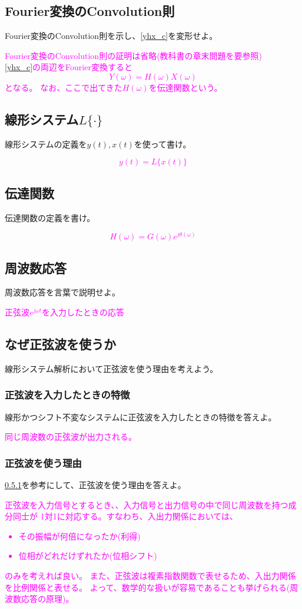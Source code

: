 \documentclass[twocolumn]{ltjsarticle}
\newcommand{\visible}{visible}
\newcommand{\ans}[1]{
\begin{tcolorbox}[\visible]
\textcolor{magenta}{#1}
\end{tcolorbox}
}
\begin{document}
\subsection{Fourier変換のConvolution則}\label{YHX}
Fourier変換のConvolution則を示し、\ref{yhx_c}を変形せよ。
\ans{Fourier変換のConvolution則の証明は省略(教科書の章末問題を要参照)\\
\ref{yhx_c}の両辺をFourier変換すると
$$Y(\omega)=H(\omega)X(\omega)$$
となる。
なお、ここで出てきた$H(\omega)$を伝達関数という。
}
\subsection{線形システム$L\{\cdot\}$}\label{yLx}
線形システムの定義を$y(t),x(t)$を使って書け。
\ans{
    $$y(t)=L\{x(t)\}$$
}
\subsection{伝達関数}\label{H}
伝達関数の定義を書け。
\ans{
    $$H(\omega)=G(\omega)e^{j\theta(\omega)}$$
}
\subsection{周波数応答}
周波数応答を言葉で説明せよ。
\ans{正弦波$e^{j\omega t}$を入力したときの応答}
\subsection{なぜ正弦波を使うか}
線形システム解析において正弦波を使う理由を考えよう。
\subsubsection{正弦波を入力したときの特徴}\label{sin}
線形かつシフト不変なシステムに正弦波を入力したときの特徴を答えよ。
\ans{
    同じ周波数の正弦波が出力される。
}
\subsubsection{正弦波を使う理由}
\ref{sin}を参考にして、正弦波を使う理由を答えよ。
\ans{
    正弦波を入力信号とするとき、、入力信号と出力信号の中で同じ周波数を持つ成分同士が
    1対1に対応する。すなわち、入出力関係においては、
    \begin{itemize}
        \item その振幅が何倍になったか(利得)
        \item 位相がどれだけずれたか(位相シフト)
    \end{itemize}
    のみを考えれば良い。
    また、正弦波は複素指数関数で表せるため、入出力関係を比例関係と表せる。
    よって、数学的な扱いが容易であることも挙げられる(周波数応答の原理)。
}
\end{document}
